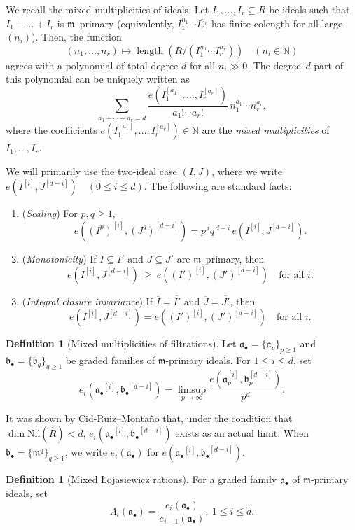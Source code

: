 \documentclass[12pt]{amsart}
\newcommand{\NN}{\mathbb{N}}
\newcommand{\m}{\mathfrak m}
\newcommand{\len}{\operatorname{\mathrm{length}}}
\renewcommand{\a}{\mathfrak{a}}
\renewcommand{\b}{\mathfrak{b}}
\newcommand{\abul}{{\a_\bullet}}
\newcommand{\bbul}{{\b_\bullet}}
\theoremstyle{plain}
\theoremstyle{definition}
\newtheorem{definition}[theorem]{Definition}
\numberwithin{equation}{section}
\begin{document}
We recall the mixed multiplicities of ideals.
Let $I_1,\dots,I_r\subseteq R$ be ideals such that $I_1 + \dots + I_r$ is $\m$--primary (equivalently, $I_1^{n_1} \cdots I_r^{n_r}$ has finite colength for all large $(n_i)$).
Then, the function
\[
(n_1,\dots,n_r)\longmapsto \len\!\left(R/(I_1^{n_1}\cdots I_r^{n_r})\right)
\quad (n_i\in\NN)
\]
agrees with a polynomial of total degree $d$ for all $n_i\gg 0$.
The degree--$d$ part of this polynomial can be uniquely written as
\[
\sum_{a_1+\cdots+a_r=d}
\frac{e(I_1^{[a_1]},\dots,I_r^{[a_r]})}{a_1!\cdots a_r!}\,
n_1^{a_1}\cdots n_r^{a_r},
\]
where the coefficients $e(I_1^{[a_1]},\dots,I_r^{[a_r]})\in \NN$ are the \emph{mixed multiplicities} of $I_1, \dots, I_r$.

We will primarily use the two-ideal case $(I,J)$, where we write
$
e(I^{[i]},J^{[d-i]})\quad (0\le i\le d).
$
The following are standard facts:
\begin{enumerate}[label=(\alph*),leftmargin=2em]
	\item (\emph{Scaling}) For $p,q\ge 1$,
	\[
	e((I^p)^{[i]},(J^q)^{[d-i]})=p^{\,i}q^{\,d-i}\,e(I^{[i]},J^{[d-i]}).
	\]
	\item (\emph{Monotonicity}) If $I\subseteq I'$ and $J\subseteq J'$ are $\m$--primary, then
	\[
	e(I^{[i]},J^{[d-i]})\ \ge\ e((I')^{[i]},(J')^{[d-i]})
	\quad \text{for all }i.
	\]
	\item (\emph{Integral closure invariance}) If $\overline I=\overline{I'}$ and
	$\overline J=\overline{J'}$, then
	\[
	e(I^{[i]},J^{[d-i]})=e((I')^{[i]},(J')^{[d-i]})
	\quad \text{for all }i.
	\]
\end{enumerate}

\begin{definition}[Mixed multiplicities of filtrations]
Let $\abul = \{\a_p\}_{p \ge 1}$ and $\bbul =\{\b_q\}_{q\ge 1}$ be graded families of $\m$-primary ideals. For $1 \le i \le d$, set
$$e_i(\abul^{[i]}, \bbul^{[d-i]}) = \limsup_{p \rightarrow \infty} \frac{e(\a_p^{[i]}, \b_p^{[d-i]})}{p^d}.$$
\end{definition}
It was shown by Cid-Ruiz--Monta\~no \cite{CidRuizMontano2022} that, under the condition that $\dim \text{Nil}(\widehat{R}) < d$, $e_i(\abul^{[i]}, \bbul^{[d-i]})$ exists as an actual limit. When $\bbul = \{\m^q\}_{q \ge 1}$, we write $e_i(\abul)$ for $e(\abul^{[i]}, \bbul^{[d-i]})$.

\begin{definition}[Mixed \L{}ojasiewicz rations]
For a graded family $\abul$ of $\m$-primary ideals, set 
$$\Lambda_i(\abul) = \frac{e_i(\abul)}{e_{i-1}(\abul)}, \ 1 \le i \le d.$$
\end{definition}
\end{document}
